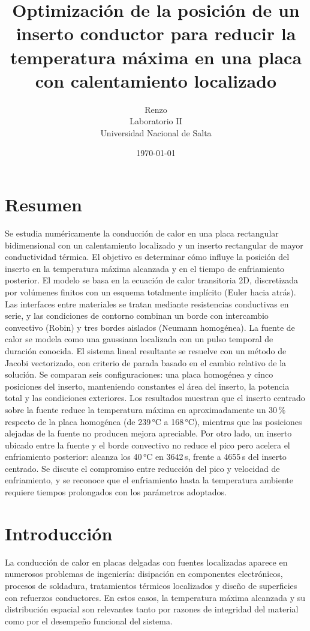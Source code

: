 \documentclass[11pt,a4paper]{article}
\title{Optimización de la posición de un inserto conductor para reducir la temperatura máxima en una placa con calentamiento localizado}
\author{Renzo \\ Laboratorio II \\ Universidad Nacional de Salta}
\date{\today}
\begin{document}
\maketitle

%
\section*{Resumen}

Se estudia numéricamente la conducción de calor en una placa rectangular bidimensional con un calentamiento localizado y un inserto rectangular de mayor conductividad térmica. El objetivo es determinar cómo influye la posición del inserto en la temperatura máxima alcanzada y en el tiempo de enfriamiento posterior. El modelo se basa en la ecuación de calor transitoria 2D, discretizada por volúmenes finitos con un esquema totalmente implícito (Euler hacia atrás). Las interfaces entre materiales se tratan mediante resistencias conductivas en serie, y las condiciones de contorno combinan un borde con intercambio convectivo (Robin) y tres bordes aislados (Neumann homogénea). La fuente de calor se modela como una gaussiana localizada con un pulso temporal de duración conocida. El sistema lineal resultante se resuelve con un método de Jacobi vectorizado, con criterio de parada basado en el cambio relativo de la solución. Se comparan seis configuraciones: una placa homogénea y cinco posiciones del inserto, manteniendo constantes el área del inserto, la potencia total y las condiciones exteriores. Los resultados muestran que el inserto centrado sobre la fuente reduce la temperatura máxima en aproximadamente un 30\,\% respecto de la placa homogénea (de 239\,°C a 168\,°C), mientras que las posiciones alejadas de la fuente no producen mejora apreciable. Por otro lado, un inserto ubicado entre la fuente y el borde convectivo no reduce el pico pero acelera el enfriamiento posterior: alcanza los 40\,°C en 3642\,s, frente a 4655\,s del inserto centrado. Se discute el compromiso entre reducción del pico y velocidad de enfriamiento, y se reconoce que el enfriamiento hasta la temperatura ambiente requiere tiempos prolongados con los parámetros adoptados.

\section{Introducción}

La conducción de calor en placas delgadas con fuentes localizadas aparece en numerosos problemas de ingeniería: disipación en componentes electrónicos, procesos de soldadura, tratamientos térmicos localizados y diseño de superficies con refuerzos conductores. En estos casos, la temperatura máxima alcanzada y su distribución espacial son relevantes tanto por razones de integridad del material como por el desempeño funcional del sistema.
\end{document}
